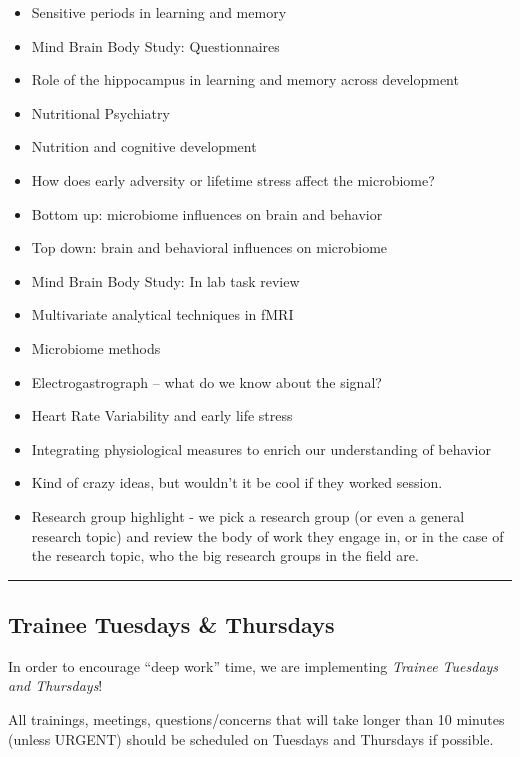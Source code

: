 \documentclass[]{book}
\providecommand{\tightlist}{%
  \setlength{\itemsep}{0pt}\setlength{\parskip}{0pt}}
\begin{document}
\begin{itemize}
\tightlist
\item
  Sensitive periods in learning and memory
\item
  Mind Brain Body Study: Questionnaires
\item
  Role of the hippocampus in learning and memory across development
\item
  Nutritional Psychiatry
\item
  Nutrition and cognitive development
\item
  How does early adversity or lifetime stress affect the microbiome?
\item
  Bottom up: microbiome influences on brain and behavior
\item
  Top down: brain and behavioral influences on microbiome
\item
  Mind Brain Body Study: In lab task review
\item
  Multivariate analytical techniques in fMRI
\item
  Microbiome methods
\item
  Electrogastrograph -- what do we know about the signal?
\item
  Heart Rate Variability and early life stress
\item
  Integrating physiological measures to enrich our understanding of behavior
\item
  Kind of crazy ideas, but wouldn't it be cool if they worked session.
\item
  Research group highlight - we pick a research group (or even a general research topic) and review the body of work they engage in, or in the case of the research topic, who the big research groups in the field are.
\end{itemize}

\begin{center}\rule{0.5\linewidth}{0.5pt}\end{center}

\hypertarget{trainee-tuesdays-thursdays}{%
\subsection{Trainee Tuesdays \& Thursdays}\label{trainee-tuesdays-thursdays}}

In order to encourage ``deep work'' time, we are implementing \emph{Trainee Tuesdays and Thursdays}!

All trainings, meetings, questions/concerns that will take longer than 10 minutes (unless URGENT) should be scheduled on Tuesdays and Thursdays if possible.
\end{document}
